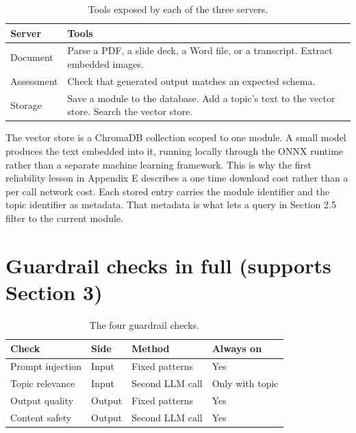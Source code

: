 \documentclass{ecai}
\begin{document}
\begin{table}[h]
\caption{Tools exposed by each of the three servers.}
\label{tab:mcp-tools}
\centering
\small
\begin{tabular}{p{1.6cm}p{4.6cm}}
\toprule
\textbf{Server} & \textbf{Tools} \\
\midrule
Document & Parse a PDF, a slide deck, a Word file, or a transcript. Extract embedded images. \\
Assessment & Check that generated output matches an expected schema. \\
Storage & Save a module to the database. Add a topic's text to the vector store. Search the vector store. \\
\bottomrule
\end{tabular}
\end{table}

The vector store is a ChromaDB collection scoped to one module. A small model
produces the text embedded into it, running locally through the ONNX runtime
rather than a separate machine learning framework. This is why the first
reliability lesson in Appendix E describes a one time download cost rather than a
per call network cost. Each stored entry carries the module identifier and the
topic identifier as metadata. That metadata is what lets a query in Section 2.5
filter to the current module.

\section{Guardrail checks in full (supports Section 3)}

\begin{table}[h]
\caption{The four guardrail checks.}
\label{tab:guardrails}
\centering
\small
\begin{tabular}{p{1.6cm}p{1.0cm}p{1.6cm}p{1.0cm}}
\toprule
\textbf{Check} & \textbf{Side} & \textbf{Method} & \textbf{Always on} \\
\midrule
Prompt injection & Input & Fixed patterns & Yes \\
Topic relevance & Input & Second LLM call & Only with topic \\
Output quality & Output & Fixed patterns & Yes \\
Content safety & Output & Second LLM call & Yes \\
\bottomrule
\end{tabular}
\end{table}
\end{document}
